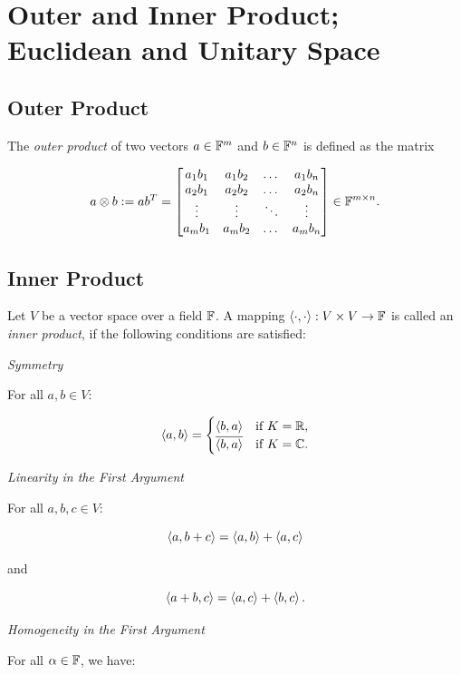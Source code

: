 \chapter{Outer and Inner Product; Euclidean and Unitary Space}

\section{Outer Product}

The \emph{outer product} of two vectors \(a \in \mathbb{F}^m\) and \(b \in \mathbb{F}^n\) is defined as the matrix

\[
    a \otimes b := a b^T = 
    \begin{bmatrix}
        a_1 b_1 & a_1 b_2 & \dots & a_1 b_n \\
        a_2 b_1 & a_2 b_2 & \dots & a_2 b_n \\
        \vdots  & \vdots  & \ddots& \vdots  \\
        a_m b_1 & a_m b_2 & \dots & a_m b_n 
    \end{bmatrix} \in \mathbb{F}^{m \times n}.
\]

\section{Inner Product}

Let \(V\) be a vector space over a field \(\mathbb{F}\). A mapping \(\langle \cdot, \cdot \rangle : V \times V 
\to \mathbb{F}\) is called an \emph{inner product}, if the following conditions are satisfied:

\emph{Symmetry}

For all \(a, b \in V\):

\[
    \left\langle a, b\right\rangle = 
    \begin{cases}
    \left\langle b, a\right\rangle & \text{if } K = \mathbb{R}, \\
    \overline{\left\langle b, a\right\rangle} & \text{if } K = \mathbb{C}.
    \end{cases}
\]

\emph{Linearity in the First Argument}

For all \(a, b, c \in V\):

\[
    \left\langle a, b + c\right\rangle = \left\langle a, b\right\rangle + \left\langle a, c\right\rangle
\]

and

\[
    \left\langle a + b, c\right\rangle = \left\langle a, c\right\rangle + \left\langle b, c\right\rangle.
\]

\emph{Homogeneity in the First Argument}

For all \(\alpha \in \mathbb{F}\), we have:

